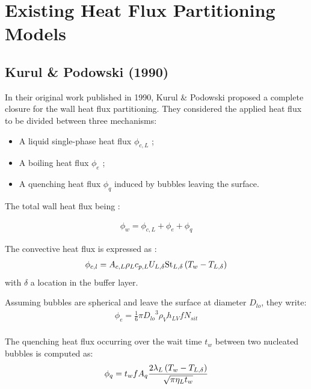 
\chapter{Existing Heat Flux Partitioning Models} %

\label{chap:HFP_bib} %


\section{Kurul \& Podowski (1990)}


In their original work published in 1990, Kurul \& Podowski \cite{kurul_1990} proposed a complete closure for the wall heat flux partitioning. They considered the applied heat flux to be divided between three mechanisms:

\begin{itemize}
\item A liquid single-phase heat flux $\phi_{c,L}$ ;
\item A boiling heat flux $\phi_{e}$ ;
\item A quenching heat flux $\phi_{q}$ induced by bubbles leaving the surface.
\end{itemize}

The total wall heat flux being :

\begin{align}
\phi_{w}=\phi_{c,L}+\phi_{e}+\phi_{q}
\end{align}

The convective heat flux is expressed as :
\begin{align}
\phi_{c,l}=A_{c,L} \rho_{L} c_{p,L}U_{L,\delta} \mathrm{St}_{L,\delta}\left( T_{w}-T_{L,\delta} \right)
\label{eq:HFP_KP_phiCL}
\end{align}
with $\delta$ a location in the buffer layer.

Assuming bubbles are spherical and leave the surface at diameter $D_{lo}$, they write:
\begin{align}
\phi_{e}=\frac{1}{6}\pi {D_{lo}}^{3}\rho_{V}h_{LV}fN_{sit}\\
\label{eq:HFP_KP_phiE}
\end{align}

The quenching heat flux occurring over the wait time $t_{w}$ between two nucleated bubbles is computed as:  
\begin{align}
\phi_{q}=t_{w}fA_{q}\frac{2\lambda_{L}\left( T_{w}-T_{L,\delta} \right)}{\sqrt{\pi \eta_{L} t_{w}}}
\label{eq:HFP_KP_phiQ}
\end{align}

